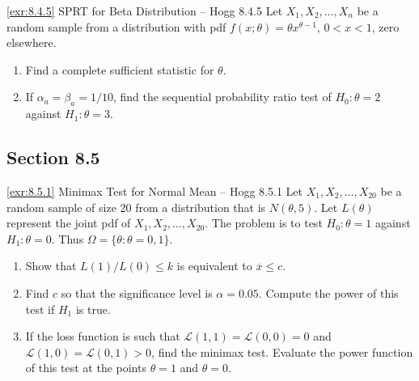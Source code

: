 \begin{exercise}{\ref{exr:8.4.5} SPRT for Beta Distribution -- Hogg 8.4.5}\label{exr:8.4.5}
Let $X_1, X_2, \ldots, X_n$ be a random sample from a distribution with pdf $f(x; \theta) = \theta x^{\theta-1}$, $0 < x < 1$, zero elsewhere.
\begin{enumerate}
\item[(a)] Find a complete sufficient statistic for $\theta$.
\item[(b)] If $\alpha_a = \beta_a = 1/10$, find the sequential probability ratio test of $H_0: \theta = 2$ against $H_1: \theta = 3$.
\end{enumerate}
\end{exercise}

\subsection*{Section 8.5}

\begin{exercise}{\ref{exr:8.5.1} Minimax Test for Normal Mean -- Hogg 8.5.1}\label{exr:8.5.1}
Let $X_1, X_2, \ldots, X_{20}$ be a random sample of size 20 from a distribution that is $N(\theta, 5)$. Let $L(\theta)$ represent the joint pdf of $X_1, X_2, \ldots, X_{20}$. The problem is to test $H_0: \theta = 1$ against $H_1: \theta = 0$. Thus $\Omega = \{\theta: \theta = 0, 1\}$.
\begin{enumerate}
\item[(a)] Show that $L(1)/L(0) \leq k$ is equivalent to $\overline{x} \leq c$.
\item[(b)] Find $c$ so that the significance level is $\alpha = 0.05$. Compute the power of this test if $H_1$ is true.
\item[(c)] If the loss function is such that $\mathcal{L}(1,1) = \mathcal{L}(0,0) = 0$ and $\mathcal{L}(1,0) = \mathcal{L}(0,1) > 0$, find the minimax test. Evaluate the power function of this test at the points $\theta = 1$ and $\theta = 0$.
\end{enumerate}
\end{exercise}

